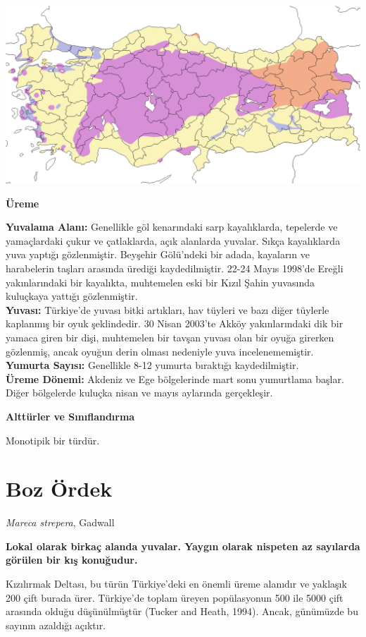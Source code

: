 \documentclass[
  a4paper,
  DIV=11,
  numbers=noendperiod]{scrartcl}
\begin{document}
\includegraphics{images/harita_Tadorna ferruginea.png}

\textbf{Üreme}

\textbf{Yuvalama Alanı:} Genellikle göl kenarındaki sarp kayalıklarda,
tepelerde ve yamaçlardaki çukur ve çatlaklarda, açık alanlarda yuvalar.
Sıkça kayalıklarda yuva yaptığı gözlenmiştir. Beyşehir Gölü'ndeki bir
adada, kayaların ve harabelerin taşları arasında ürediği kaydedilmiştir.
22-24 Mayıs 1998'de Ereğli yakınlarındaki bir kayalıkta, muhtemelen eski
bir Kızıl Şahin yuvasında kuluçkaya yattığı gözlenmiştir.\\
\textbf{Yuvası:} Türkiye'de yuvası bitki artıkları, hav tüyleri ve bazı
diğer tüylerle kaplanmış bir oyuk şeklindedir. 30 Nisan 2003'te Akköy
yakınlarındaki dik bir yamaca giren bir dişi, muhtemelen bir tavşan
yuvası olan bir oyuğa girerken gözlenmiş, ancak oyuğun derin olması
nedeniyle yuva incelenememiştir.\\
\textbf{Yumurta Sayısı:} Genellikle 8-12 yumurta bıraktığı
kaydedilmiştir.\\
\textbf{Üreme Dönemi:} Akdeniz ve Ege bölgelerinde mart sonu yumurtlama
başlar. Diğer bölgelerde kuluçka nisan ve mayıs aylarında gerçekleşir.

\textbf{Alttürler ve Sınıflandırma}

Monotipik bir türdür.

\section{Boz Ördek}\label{boz-uxf6rdek}

\emph{Mareca strepera}, Gadwall

\textbf{Lokal olarak birkaç alanda yuvalar. Yaygın olarak nispeten az
sayılarda görülen bir kış konuğudur.}

Kızılırmak Deltası, bu türün Türkiye'deki en önemli üreme alanıdır ve
yaklaşık 200 çift burada ürer. Türkiye'de toplam üreyen popülasyonun 500
ile 5000 çift arasında olduğu düşünülmüştür (Tucker and Heath, 1994).
Ancak, günümüzde bu sayının azaldığı açıktır.
\end{document}
